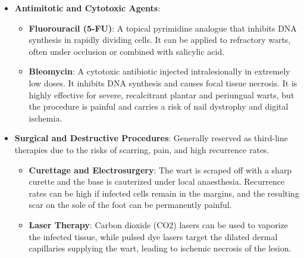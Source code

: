 \begin{itemize}
    \begin{itemize}
        \item \textbf{Intralesional Antigen Injections}: Injection of antigen solutions, such as Candida antigen, mumps antigen, or Trichophyton antigen, directly into a single ``primary'' wart. The local immune response generated against the antigen often leads to systemic clearance of both the injected wart and distant, non-injected warts.
        \item \textbf{Topical Sensitizers}: Application of contact allergens like diphenylcyclopropenone (DPCP) or squaric acid dibutyl ester (SADBE) to induce a localized delayed-type hypersensitivity reaction (allergic contact dermatitis) at the site of the warts, promoting viral clearance.
        \item \textbf{Imiquimod}: A topical immunomodulator cream (typically 5\%) that stimulates the local production of interferon-alpha and other pro-inflammatory cytokines. It is primarily used for genital warts but is also applied off-label to flat and common warts, often under occlusion.
    \end{itemize}
    \item \textbf{Antimitotic and Cytotoxic Agents}:
    \begin{itemize}
        \item \textbf{Fluorouracil (5-FU)}: A topical pyrimidine analogue that inhibits DNA synthesis in rapidly dividing cells. It can be applied to refractory warts, often under occlusion or combined with salicylic acid.
        \item \textbf{Bleomycin}: A cytotoxic antibiotic injected intralesionally in extremely low doses. It inhibits DNA synthesis and causes focal tissue necrosis. It is highly effective for severe, recalcitrant plantar and periungual warts, but the procedure is painful and carries a risk of nail dystrophy and digital ischemia.
    \end{itemize}
    \item \textbf{Surgical and Destructive Procedures}: Generally reserved as third-line therapies due to the risks of scarring, pain, and high recurrence rates.
    \begin{itemize}
        \item \textbf{Curettage and Electrosurgery}: The wart is scraped off with a sharp curette and the base is cauterized under local anaesthesia. Recurrence rates can be high if infected cells remain in the margins, and the resulting scar on the sole of the foot can be permanently painful.
        \item \textbf{Laser Therapy}: Carbon dioxide (CO2) lasers can be used to vaporize the infected tissue, while pulsed dye lasers target the dilated dermal capillaries supplying the wart, leading to ischemic necrosis of the lesion.
    \end{itemize}
\end{itemize}

